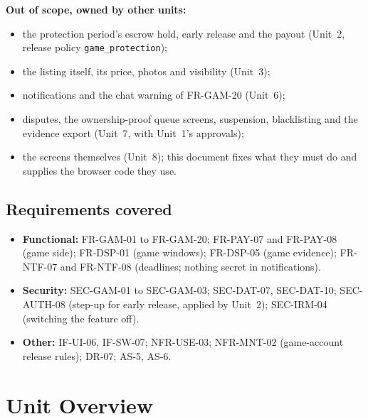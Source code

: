 \documentclass[11pt,a4paper]{article}
\begin{document}
\textbf{Out of scope, owned by other units:}
\begin{itemize}[nosep]
  \item the protection period's escrow hold, early release and the payout (Unit~2, release policy \texttt{game\_protection});
  \item the listing itself, its price, photos and visibility (Unit~3);
  \item notifications and the chat warning of FR-GAM-20 (Unit~6);
  \item disputes, the ownership-proof queue screens, suspension, blacklisting and the evidence export (Unit~7, with Unit~1's approvals);
  \item the screens themselves (Unit~8); this document fixes what they must do and supplies the browser code they use.
\end{itemize}

\subsection{Requirements covered}
\begin{itemize}[nosep]
  \item \textbf{Functional:} FR-GAM-01 to FR-GAM-20; FR-PAY-07 and FR-PAY-08 (game side); FR-DSP-01 (game windows); FR-DSP-05 (game evidence); FR-NTF-07 and FR-NTF-08 (deadlines; nothing secret in notifications).
  \item \textbf{Security:} SEC-GAM-01 to SEC-GAM-03; SEC-DAT-07, SEC-DAT-10; SEC-AUTH-08 (step-up for early release, applied by Unit~2); SEC-IRM-04 (switching the feature off).
  \item \textbf{Other:} IF-UI-06, IF-SW-07; NFR-USE-03; NFR-MNT-02 (game-account release rules); DR-07; AS-5, AS-6.
\end{itemize}

\section{Unit Overview}
\end{document}
